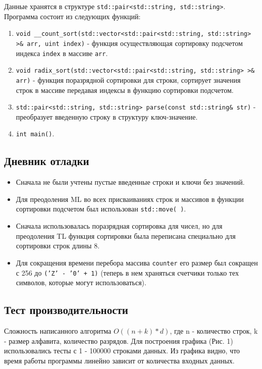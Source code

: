\documentclass[12pt]{article}
\begin{document}
Данные хранятся в структуре \texttt{std::pair<std::string, std::string>}.
Программа состоит из следующих функций:
\begin{enumerate}
    \item \texttt{void \_\_count\_sort(std::vector<std::pair<std::string, std::string> >\& arr, uint index)}
    - функция осуществляющая сортировку подсчетом индекса \texttt{index} в массиве \texttt{arr}.
    \item \texttt{void radix\_sort(std::vector<std::pair<std::string, std::string> >\& arr)}
    - функция поразрядной сортировки для строки, сортирует значения строк в массиве передавая индексы в функцию сортировки подсчетом.
    \item \texttt{std::pair<std::string, std::string> parse(const std::string\& str)}
    - преобразует введенную строку в структуру ключ-значение.
    \item \texttt{int main()}.
\end{enumerate}

\newpage
\subsection*{Дневник отладки}

\begin{itemize}
    \item Сначала не были учтены пустые введенные строки и ключи без значений.
    \item Для преодоления ML во всех присваиваниях строк и массивов в функции сортировки подсчетом был использован \texttt{std::move( )}.
    \item Сначала использовалась поразрядная сортировка для чисел, но для преодоления TL функция сортировки была переписана специально для сортировки строк длины 8.
    \item Для сокращения времени перебора массива \texttt{counter} его размер был сокращен с 256 до \texttt{('Z' - '0' + 1)} 
    (теперь в нем храняться счетчики только тех символов, которые могут использоваться).
\end{itemize}

\newpage
\subsection*{Тест производительности}

Сложность написанного алгоритма $O((n+k)*d)$, где n - количество строк, k - размер алфавита, количество разрядов. Для построения графика (Рис. 1) использовались тесты с 1 - 100000 строками данных.
Из графика видно, что время работы программы линейно зависит от количества входных данных.
\end{document}

